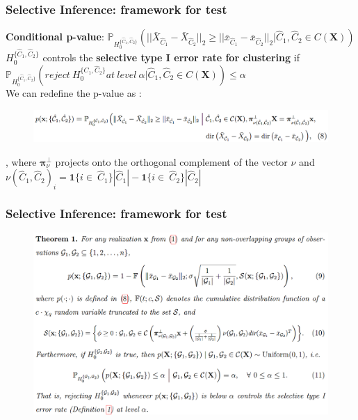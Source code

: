 \documentclass{beamer}
\begin{document}
	\begin{frame}
		\frametitle{Selective Inference: framework for test}
		\textbf{Conditional p-value}: $\mathbb{P}_{H_0^{\{\hat{C}_1, \hat{C}_2\}}}(||\bar{X}_{\hat{C}_1} - \bar{X}_{\hat{C}_2}||_2 \geq ||\bar{x}_{\hat{C}_1} - \bar{x}_{\hat{C}_2}||_2 | \hat{C}_1, \hat{C}_2 \in C(\bm{X}))$\\
		$H_0^{\{\hat{C}_1, \hat{C}_2\}}$ controls the \textbf{selective type I error rate for clustering} if $\mathbb{P}_{H_0^{\{\hat{C}_1, \hat{C}_2\}}}(reject \  H_0^{\{\hat{C}_1, \hat{C}_2\}} at\  level\ \alpha | \hat{C}_1, \hat{C}_2 \in C(\bm{X}))\leq \alpha$\\
		We can redefine the p-value as :
		\begin{figure}
			\includegraphics[width=1\linewidth]{image003.png}
		\end{figure}
		, where $\bm{\pi}^{\perp}_\nu$ projects onto the orthogonal complement of the vector $\nu$ and $\nu(\hat{C}_1, \hat{C}_2)_{i} = \bm{1} \{i\in\ \hat{C}_1\}|\hat{C}_1| - \bm{1}\{i\in\ \hat{C}_2\}|\hat{C}_2|$
		
	\end{frame}
	
	\begin{frame}
		\frametitle{Selective Inference: framework for test}
		\begin{figure}
			\includegraphics[width=1\linewidth]{image004.png}
		\end{figure}
	\end{frame}
	
\end{document}

